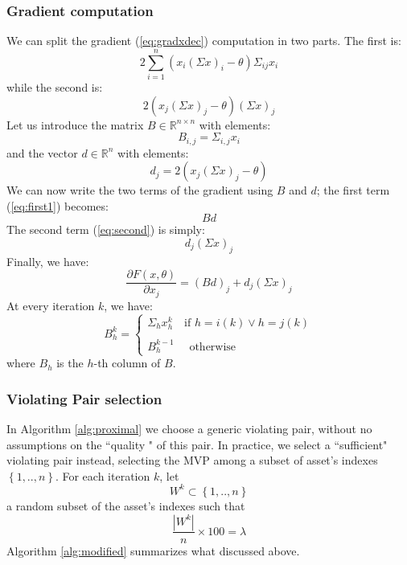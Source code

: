\subsubsection{Gradient computation}
We can split the gradient (\ref{eq:gradxdec}) computation in two parts. The first is:
\begin{equation}\label{eq:first1}
2 \sum_{i=1}^n \left(x_i (\Sigma x)_i - \theta\right)\Sigma_{ij}x_i
\end{equation}
while the second is:
\begin{equation}\label{eq:second}
2(x_j (\Sigma x)_j - \theta)(\Sigma x)_j
\end{equation}
Let us introduce the matrix $B \in \mathbb{R}^{n \times n}$ with elements:
\begin{equation}
B_{i,j} = \Sigma_{i,j}  x_i 
\end{equation}
and the vector $d \in \mathbb{R}^n$ with elements:
\begin{equation}
d_j = 2 (x_j (\Sigma x)_j - \theta) 
\end{equation}
We can now write the two terms of the gradient using $B$ and $d$; the first term (\ref{eq:first1}) becomes:
\begin{equation}
B d
\end{equation}
The second term (\ref{eq:second}) is simply:
\begin{equation}
d_j (\Sigma x)_j
\end{equation}
Finally, we have:
\begin{equation}\label{eq:newgradx}
\frac{\partial F(x,\theta)}{\partial x_j} =\left(B d\right)_j + d_j (\Sigma x)_j
\end{equation}
At every iteration $k$, we have:
\begin{equation}
B^{k}_{h} = \begin{cases}
		  		\Sigma_{h}x_h^{k} \quad \text{if } h = i(k) \vee h = j(k)\\\\
		  	    B^{k-1}_{h} \quad \text{     otherwise}
		  		\end{cases}
\end{equation}
where $B_{h}$ is the $h$-th column of $B$.

\subsubsection{Violating Pair selection}
In Algorithm \ref{alg:proximal} we choose a generic violating pair, without no assumptions on the \textquotedblleft quality " of this pair. In practice, we select a \textquotedblleft sufficient" violating pair instead, selecting the MVP among a subset of asset's indexes $\left\{1,.., n\right\}$. For each iteration $k$, let
\begin{equation}\label{eq:wk}
W^k \subset \left\{1,.., n\right\}
\end{equation}
a random subset of the asset's indexes such that
\begin{equation}\label{eq:wk2}
\frac{|W^k|}{n} \times 100 = \lambda
\end{equation}
Algorithm \ref{alg:modified} summarizes what discussed above.

